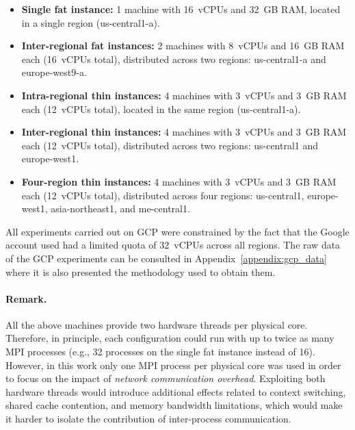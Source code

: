 \documentclass{article}
\begin{document}
\begin{itemize}
    \item \textbf{Single fat instance:} 1 machine with 16~vCPUs and 32~GB RAM, located in a single region (us-central1-a).
    \item \textbf{Inter-regional fat instances:} 2 machines with 8~vCPUs and 16~GB RAM each (16~vCPUs total), distributed across two regions: us-central1-a and europe-west9-a.
    \item \textbf{Intra-regional thin instances:} 4 machines with 3~vCPUs and 3~GB RAM each (12~vCPUs total), located in the same region (us-central1-a).
    \item \textbf{Inter-regional thin instances:} 4 machines with 3~vCPUs and 3~GB RAM each (12~vCPUs total), distributed across two regions: us-central1 and europe-west1.
    \item \textbf{Four-region thin instances:} 4 machines with 3~vCPUs and 3~GB RAM each (12~vCPUs total), distributed across four regions: us-central1, europe-west1, asia-northeast1, and me-central1.
\end{itemize}

All experiments carried out on GCP were constrained by the fact that the Google account used had a limited quota of 32~vCPUs across all regions.
The raw data of the GCP experiments can be consulted in Appendix~\ref{appendix:gcp_data} where it is also presented the methodology used to obtain them.

\paragraph{Remark.}  
All the above machines provide two hardware threads per physical core.  
Therefore, in principle, each configuration could run with up to twice as many MPI processes (e.g., 32 processes on the single fat instance instead of 16).  
However, in this work only one MPI process per physical core was used in order to focus on the impact of \emph{network communication overhead}.  
Exploiting both hardware threads would introduce additional effects related to context switching, shared cache contention, and memory bandwidth limitations, which would make it harder to isolate the contribution of inter-process communication.
\end{document}
